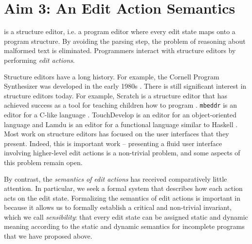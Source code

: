 \section{Aim 3: An Edit Action Semantics}\label{sec:actions}

\HazelEnv is a structure editor, i.e. a 
program editor where every edit state maps onto a program structure. By
avoiding the parsing step, the problem of reasoning about malformed text is
eliminated.  Programmers interact with structure editors by performing
\emph{edit actions}.

Structure editors have a long history. For example, the Cornell Program
Synthesizer was developed in the early 1980s \cite{teitelbaum_cornell_1981}. There is still significant   
 interest in structure editors today. For example,  Scratch is a 
structure editor that has achieved success as a tool for teaching children
how to program \cite{Resnick:2009:SP:1592761.1592779}. \texttt{mbeddr} is an editor for a C-like
language \cite{voelter_mbeddr:_2012}. TouchDevelop is an editor for an
object-oriented language \cite{tillmann_touchdevelop:_2011} and Lamdu is an
editor for a functional language similar to Haskell \cite{lamdu}. Most work on structure editors has focused on the user
interfaces that they present. Indeed, this is important work -- presenting a
fluid user interface involving higher-level edit actions is a non-trivial
problem, and some aspects of this problem remain open.

By contrast, the \emph{semantics of edit actions} has received comparatively little
attention. In particular, we seek a formal system that describes how each action acts on the edit
state. 
Formalizing the semantics of edit actions is important in \HazelEnv
because it allows us to formally establish a critical and non-trivial invariant,
which we call \emph{sensibility}: that every edit state can be assigned static
and dynamic meaning according to the static and dynamic semantics for incomplete
programs that we have proposed above. 


